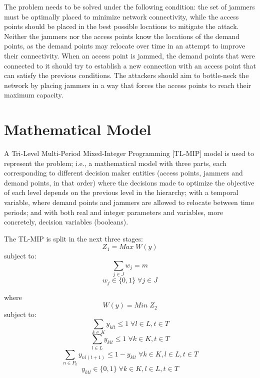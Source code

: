 \documentclass[runningheads]{llncs}
\begin{document}
The problem needs to be solved under the following condition: the set of jammers must be optimally placed to minimize network connectivity, while the access points should be placed in the best possible locations to mitigate the attack. Neither the jammers nor the access points know the locations of the demand points, as the demand points may relocate over time in an attempt to improve their connectivity.
When an access point is jammed, the demand points that were connected to it should try to establish a new connection with an access point that can satisfy the previous conditions. The attackers should aim to bottle-neck the network by placing jammers in a way that forces the access points to reach their maximum capacity.


\section{Mathematical Model}

A Tri-Level Multi-Period Mixed-Integer Programming [TL-MIP] model is used to represent the problem; i.e., a mathematical model with three parts, each corresponding to different decision maker entities (access points, jammers and demand points, in that order) where the decisions made to optimize the objective of each level depends on the previous level in the hierarchy; with a temporal variable, where demand points and jammers are allowed to relocate between time periods; and with both real and integer parameters and variables, more concretely, decision variables (booleans).

The TL-MIP is split in the next three stages:
\small
\begin{equation}\tag{1a}
    Z_1 = Max \; W(y)
\end{equation}
subject to:
\begin{equation}\tag{1b}
    \sum_{j \in J} w_j = m
\end{equation}
\begin{equation}\tag{1c}
    w_j \in \{0,1\} \; \forall j \in J
\end{equation}

where
\begin{equation}\tag{2a}
    W(y) = Min \; Z_2
\end{equation}
subject to:
\begin{equation}\tag{2b}
    \sum_{k \in K} y_{klt} \leq 1 \; \forall l \in L, t \in T
\end{equation}
\begin{equation}\tag{2c}
    \sum_{l \in L} y_{klt} \leq 1 \; \forall k \in K, t \in T
\end{equation}
\begin{equation}\tag{2d}
    \sum_{n \in P_k} y_{nl(t+1)} \leq 1-y_{klt} \; \forall k \in K, l \in L, t \in T
\end{equation}
\begin{equation}\tag{2e}
    y_{ktl} \in \{0,1\} \; \forall k\in K, l \in L, t \in T
\end{equation}
\end{document}
